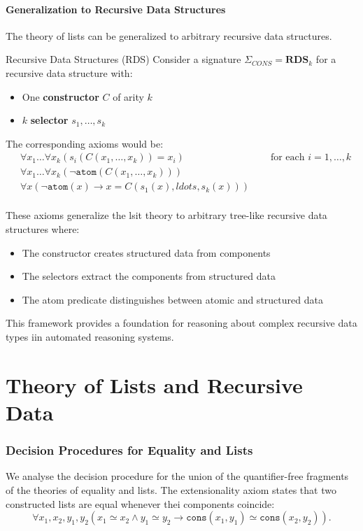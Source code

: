 \documentclass[a4paper]{article}
\theoremstyle{definition}
\begin{document}
\subsection{Generalization to Recursive Data Structures}
The theory of lists can be generalized to arbitrary recursive data structures.
\begin{definition}{Recursive Data Structures (RDS)}
Consider a signature \( \Sigma_{CONS} = \textbf{RDS}_k \) for a recursive data structure with: 
\begin{itemize}
	\item One \textbf{constructor} \( C \) of arity \( k \)     
	\item \( k \) \textbf{selector} \( s_1, \ldots, s_k \)
\end{itemize}	
The corresponding axioms would be:
\begin{align*}
	& \forall x_1 \ldots \forall x_k (s_i(C(x_1, \ldots, x_k)) = x_i) & \quad \text{ for each } i = 1, \ldots, k\\
	& \forall x_1 \ldots \forall x_k (\lnot \texttt{atom}(C(x_1, \ldots, x_k))) \\
	& \forall x (\lnot \texttt{atom}(x) \rightarrow x = C(s_1(x), ldots, s_k(x)))\\
\end{align*}
\end{definition}
These axioms generalize the lsit theory to arbitrary tree-like recursive data structures where:
\begin{itemize}
	\item The constructor creates structured data from components 
	\item The selectors extract the components from structured data 
	\item The atom predicate distinguishes between atomic and structured data
\end{itemize}
This framework provides a foundation for reasoning about complex recursive data types iin automated reasoning systems.
\part{Theory of Lists and Recursive Data}
\section{Decision Procedures for Equality and Lists}
We analyse the decision procedure for the union of the quantifier-free fragments of the theories of equality and lists.
The extensionality axiom states that two constructed lists are equal whenever thei components coincide:
\[
  \forall x_1,x_2,y_1,y_2 (x_1 \simeq x_2 \wedge y_1 \simeq y_2 \rightarrow \texttt{cons}(x_1, y_1) \simeq \texttt{cons}(x_2,y_2)).
\]
\end{document}
